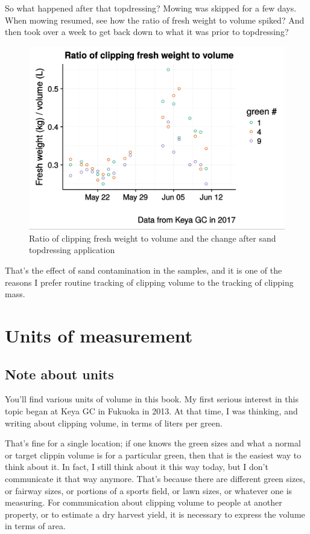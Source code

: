 \documentclass[12pt,b5,]{tufte-book}
\begin{document}
So what happened after that topdressing? Mowing was skipped for a few days. When mowing resumed, see how the ratio of fresh weight to volume spiked? And then took over a week to get back down to what it was prior to topdressing?

\begin{figure}
\centering
\includegraphics{img/ratioChart.png}
\caption{Ratio of clipping fresh weight to volume and the change after sand topdressing application}
\end{figure}

That's the effect of sand contamination in the samples, and it is one of the reasons I prefer routine tracking of clipping volume to the tracking of clipping mass.

\hypertarget{unitsChapter}{%
\chapter{Units of measurement}\label{unitsChapter}}

\hypertarget{note-about-units}{%
\section{Note about units}\label{note-about-units}}

You'll find various units of volume in this book. My first serious interest in this topic began at Keya GC in Fukuoka in 2013. At that time, I was thinking, and writing about clipping volume, in terms of liters per green.

That's fine for a single location; if one knows the green sizes and what a normal or target clippin volume is for a particular green, then that is the easiest way to think about it. In fact, I still think about it this way today, but I don't communicate it that way anymore. That's because there are different green sizes, or fairway sizes, or portions of a sports field, or lawn sizes, or whatever one is measuring. For communication about clipping volume to people at another property, or to estimate a dry harvest yield, it is necessary to express the volume in terms of area.
\end{document}
